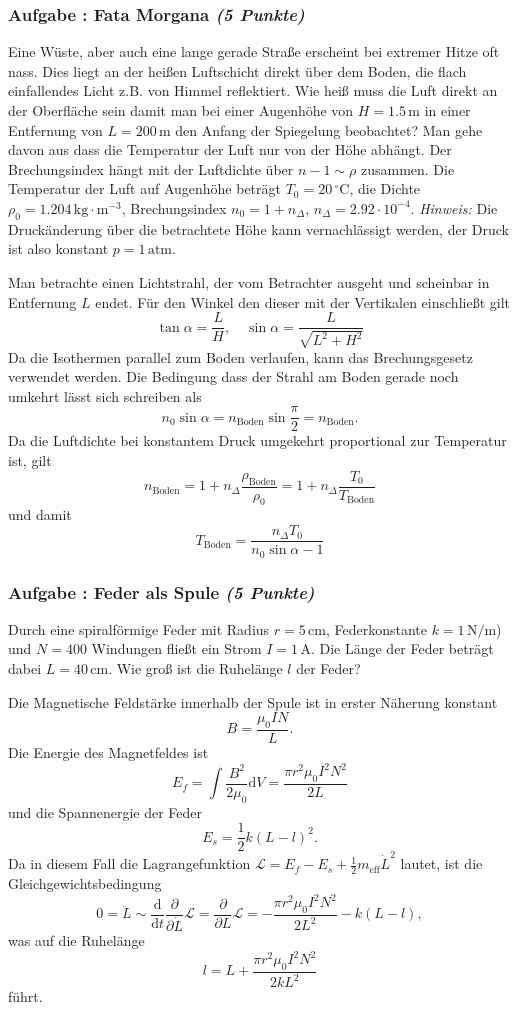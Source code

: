 \documentclass[12pt,a4paper]{article}
\newcommand{\ee}[1]{\cdot 10^{#1}}
\newcommand{\unit}[1]{\,\mathrm{#1}}
\newcommand{\dif}{\mathrm{d}}
\newcommand{\tdif}[2]{\frac{\dif#1}{\dif#2}}
\newcommand{\pdif}[2]{\frac{\partial#1}{\partial#2}}
\newcommand{\cel}{\,^\circ\mathrm{C}}
\newcommand{\hinweis}{\emph{Hinweis:} }
\newcounter{numlabel}
\newenvironment{problem}[2]{\stepcounter{numlabel} \vspace{1ex} \subsubsection*{Aufgabe \the\value{numlabel}: #1 \emph{(#2 Punkte)}} \renewcommand{\Currentlabel}{Aufgabe \the\value{numlabel}: #1}}{

}
\begin{document}
\begin{problem}{Fata Morgana}{5}
Eine Wüste, aber auch eine lange gerade Straße erscheint bei extremer Hitze oft nass. Dies liegt an der heißen Luftschicht direkt über dem Boden, die flach einfallendes Licht z.B. von Himmel reflektiert. Wie heiß muss die Luft direkt an der Oberfläche sein damit man bei einer Augenhöhe von $H = 1.5 \unit{m}$ in einer Entfernung von $L = 200 \unit{m}$ den Anfang der Spiegelung beobachtet? Man gehe davon aus dass die Temperatur der Luft nur von der Höhe abhängt. Der Brechungsindex hängt mit der Luftdichte über $n-1 \sim \rho$ zusammen. Die Temperatur der Luft auf Augenhöhe beträgt $T_0 = 20 \cel$, die Dichte $\rho_0 = 1.204 \unit{kg \cdot m^{-3}}$, Brechungsindex $n_0 = 1 + n_\Delta$, $n_\Delta = 2.92\ee{-4}$. \hinweis Die Druckänderung über die betrachtete Höhe kann vernachlässigt werden, der Druck ist also konstant $p = 1 \unit{atm}$.
\begin{solution}
Man betrachte einen Lichtstrahl, der vom Betrachter ausgeht und scheinbar in Entfernung $L$ endet. Für den Winkel den dieser mit der Vertikalen einschließt gilt
\[
\tan\alpha = \frac{L}{H}, \quad \sin\alpha = \frac{L}{\sqrt{L^2 + H^2}}
\]
Da die Isothermen parallel zum Boden verlaufen, kann das Brechungsgesetz verwendet werden. Die Bedingung dass der Strahl am Boden gerade noch umkehrt lässt sich schreiben als
\[
n_0 \sin\alpha = n_\mathrm{Boden} \sin\frac\pi2 = n_\mathrm{Boden}.
\]
Da die Luftdichte bei konstantem Druck umgekehrt proportional zur Temperatur ist, gilt
\[
n_\mathrm{Boden} = 1 + n_\Delta \frac{\rho_\mathrm{Boden}}{\rho_0} = 1 + n_\Delta \frac{T_0}{T_\mathrm{Boden}}
\]
und damit
\[
T_\mathrm{Boden} = \frac{ n_\Delta T_0 }{ n_0 \sin\alpha - 1 }
\]
\end{solution}
\end{problem}


\begin{problem}{Feder als Spule}{5}
Durch eine spiralförmige Feder mit Radius $r = 5 \unit{cm}$, Federkonstante $k = 1 \unit{N/m}$) und $N = 400$ Windungen fließt ein Strom $I = 1 \unit{A}$. Die Länge der Feder beträgt dabei $L = 40 \unit{cm}$. Wie groß ist die Ruhelänge $l$ der Feder?
\begin{solution}
Die Magnetische Feldstärke innerhalb der Spule ist in erster Näherung konstant
\[
B = \frac{\mu_0 I N}{L}.
\]
Die Energie des Magnetfeldes ist
\[
E_f = \int \frac{B^2}{2 \mu_0} \dif V = \frac{\pi r^2 \mu_0 I^2 N^2 }{2 L}
\]
und die Spannenergie der Feder
\[
E_s = \frac12 k \left( L - l \right)^2.
\]
Da in diesem Fall die Lagrangefunktion $\mathcal L =E_f - E_s + \frac12 m_\mathrm{eff} \dot L^2$ lautet, ist die Gleichgewichtsbedingung
\[
0 = \ddot L \sim \tdif{}{t} \pdif{}{\dot L} \mathcal L = \pdif{}{L} \mathcal L =  - \frac{\pi r^2 \mu_0 I^2 N^2 }{2 L^2} - k \left( L - l \right),
\]
was auf die Ruhelänge
\[
l  =  L + \frac{\pi r^2 \mu_0 I^2 N^2 }{2 k L^2}
\]
führt.
\end{solution}
\end{problem}
\end{document}

